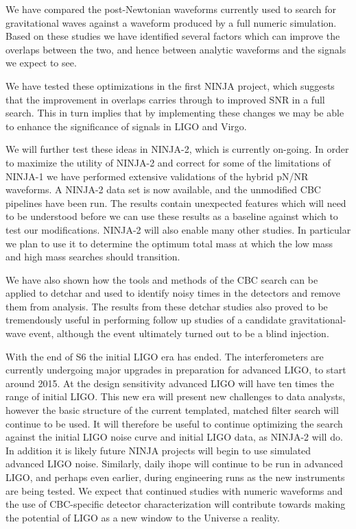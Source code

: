 We have compared the post-Newtonian waveforms currently used to
search for gravitational waves against a waveform produced by 
a full numeric simulation.  Based on these studies we have identified
several factors which can improve the overlaps between the two, and
hence between analytic waveforms and the signals we expect to see.

We have tested these optimizations in the first NINJA project, which
suggests that the improvement in overlaps carries through to improved
SNR in a full search.  This in turn implies that by implementing these
changes we may be able to enhance the significance of signals in LIGO
and Virgo.

We will further test these ideas in NINJA-2, which is currently
on-going.  In order to maximize the utility of NINJA-2 and correct
for some of the limitations of NINJA-1 we have performed extensive
validations of the hybrid pN/NR waveforms.  A NINJA-2 data set is now
available, and the unmodified CBC pipelines have been run.  The
results contain unexpected features which will need to be understood
before we can use these results as a baseline against which to test
our modifications.  NINJA-2 will also enable many other studies.  In
particular we plan to use it to determine the optimum total mass at
which the low mass and high mass searches should transition.

We have also shown how the tools and methods of the CBC search can be
applied to detchar and used to identify noisy times in the detectors
and remove them from analysis.  The results from these detchar studies
also proved to be tremendously useful in performing follow up studies
of a candidate gravitational-wave event, although the event ultimately
turned out to be a blind injection.

With the end of S6 the initial LIGO era has ended.  The
interferometers are currently undergoing major upgrades in preparation
for advanced LIGO, to start around 2015.  At the design sensitivity
advanced LIGO will have ten times the range of initial LIGO.  This new
era will present new challenges to data analysts, however the basic
structure of the current templated, matched filter search will
continue to be used.   It will therefore be useful to continue
optimizing the search against the initial LIGO noise curve and initial
LIGO data, as NINJA-2 will do.  In addition it is likely future NINJA
projects will begin to use simulated advanced LIGO noise.  Similarly,
daily ihope will continue to be run in advanced LIGO, and perhaps even
earlier, during engineering runs as the new instruments are being
tested.  We expect that continued studies with numeric waveforms and
the use of CBC-specific detector characterization will contribute
towards making the potential of LIGO as a new window to the Universe a
reality.


